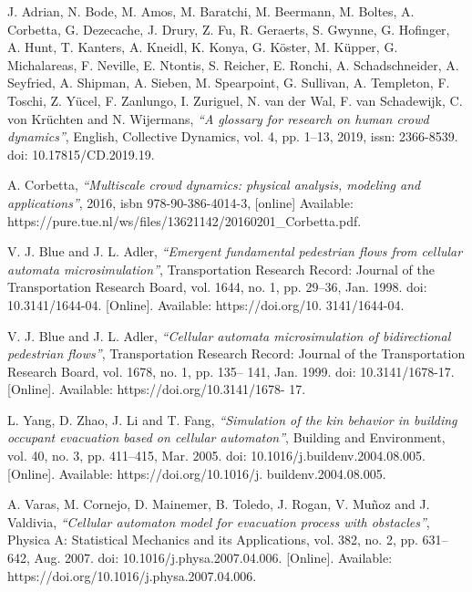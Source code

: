 \documentclass{standalone}
\begin{document}
\begin{thebibliography}{99}
J. Adrian, N. Bode, M. Amos, M. Baratchi, M. Beermann, M. Boltes, A. Corbetta, G. Dezecache, J. Drury, Z. Fu, R. Geraerts, S. Gwynne, G. Hofinger, A. Hunt, T. Kanters, A. Kneidl, K. Konya, G. Köster, M. Küpper, G. Michalareas, F. Neville, E. Ntontis, S. Reicher, E. Ronchi, A. Schadschneider, A. Seyfried, A. Shipman, A. Sieben, M. Spearpoint, G. Sullivan, A. Templeton, F. Toschi, Z. Yücel, F. Zanlungo, I. Zuriguel, N. van der Wal, F. van Schadewijk, C. von Krüchten and N. Wijermans, 
  \textit{“A glossary for research on human crowd dynamics”}, 
  English, Collective Dynamics, 
  vol. 4, pp. 1–13, 2019, 
  issn: 2366-8539. 
  doi: 10.17815/CD.2019.19.

A. Corbetta, 
  \textit{“Multiscale crowd dynamics: physical analysis, modeling and applications”}, 
2016,
isbn 978-90-386-4014-3,
[online] Available: https://pure.tue.nl/ws/files/13621142/20160201\_Corbetta.pdf.

V. J. Blue and J. L. Adler, 
  \textit{“Emergent fundamental pedestrian flows from cellular automata microsimulation”}, 
  Transportation Research Record: Journal of the Transportation Research Board, vol. 1644, no. 1, pp. 29–36, 
  Jan. 1998. 
  doi: 10.3141/1644-04. 
  [Online]. Available: https://doi.org/10. 3141/1644-04.

V. J. Blue and J. L. Adler, 
  \textit{“Cellular automata microsimulation of bidirectional pedestrian flows”}, 
  Transportation Research Record: Journal of the Transportation Research Board, vol. 1678, no. 1, pp. 135– 141, 
  Jan. 1999. 
  doi: 10.3141/1678-17. 
  [Online]. Available: https://doi.org/10.3141/1678- 17.

L. Yang, D. Zhao, J. Li and T. Fang,
  \textit{“Simulation of the kin behavior in building occupant evacuation based on cellular automaton”}, 
Building and Environment, vol. 40, no. 3, pp. 411–415, 
Mar. 2005. 
doi: 10.1016/j.buildenv.2004.08.005. 
[Online]. Available: https://doi.org/10.1016/j. buildenv.2004.08.005.

A. Varas, M. Cornejo, D. Mainemer, B. Toledo, J. Rogan, V. Muñoz and J. Valdivia, 
  \textit{“Cellular automaton model for evacuation process with obstacles”}, 
Physica A: Statistical Mechanics and its Applications, vol. 382, no. 2, pp. 631–642, 
Aug. 2007. 
doi: 10.1016/j.physa.2007.04.006. 
[Online]. Available: https://doi.org/10.1016/j.physa.2007.04.006.


\end{thebibliography}
\end{document}
